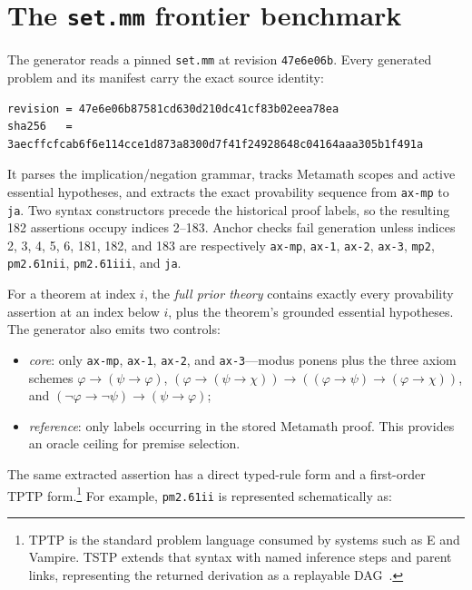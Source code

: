 \documentclass[10pt]{article}
\begin{document}
\section{The \texttt{set.mm} frontier benchmark}

The generator reads a pinned \texttt{set.mm} at revision
\texttt{47e6e06b}.  Every generated problem and its manifest carry the exact
source identity:

\begin{lstlisting}
revision = 47e6e06b87581cd630d210dc41cf83b02eea78ea
sha256   = 3aecffcfcab6f6e114cce1d873a8300d7f41f24928648c04164aaa305b1f491a
\end{lstlisting}

It parses the implication/negation grammar, tracks Metamath scopes and active
essential hypotheses, and extracts the exact provability sequence from
\texttt{ax-mp} to \texttt{ja}.  Two syntax constructors precede the historical
proof labels, so the resulting 182 assertions occupy indices 2--183.  Anchor
checks fail generation unless indices 2, 3, 4, 5, 6, 181, 182, and 183 are
respectively \texttt{ax-mp}, \texttt{ax-1}, \texttt{ax-2}, \texttt{ax-3},
\texttt{mp2}, \texttt{pm2.61nii}, \texttt{pm2.61iii}, and \texttt{ja}.

For a theorem at index $i$, the \emph{full prior theory} contains exactly every
provability assertion at an index below $i$, plus the theorem's grounded
essential hypotheses.  The generator also emits two controls:

\begin{itemize}
\item \emph{core}: only \texttt{ax-mp}, \texttt{ax-1}, \texttt{ax-2}, and
  \texttt{ax-3}---modus ponens plus the three axiom schemes
  $\varphi\to(\psi\to\varphi)$,
  $(\varphi\to(\psi\to\chi))\to((\varphi\to\psi)\to(\varphi\to\chi))$, and
  $(\neg\varphi\to\neg\psi)\to(\psi\to\varphi)$;
\item \emph{reference}: only labels occurring in the stored Metamath proof.
  This provides an oracle ceiling for premise selection.
\end{itemize}

The same extracted assertion has a direct typed-rule form and a first-order
TPTP form.\footnote{TPTP is the standard problem language consumed by systems
such as E and Vampire.  TSTP extends that syntax with named inference steps and
parent links, representing the returned derivation as a replayable
DAG~\cite{tptp-derivations}.}  For example, \texttt{pm2.61ii} is represented
schematically as:
\end{document}
